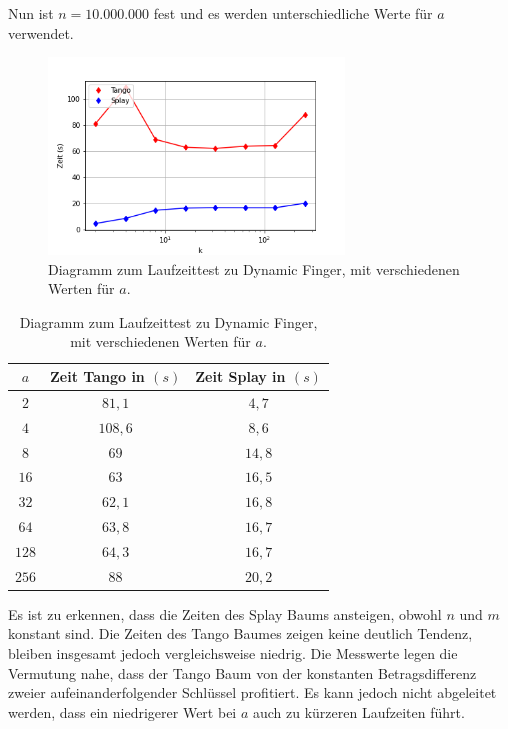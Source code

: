 \documentclass[a4paper,12pt]{article}
\begin{document}
\noindent Nun ist $n = 10.000.000$ fest und es werden unterschiedliche Werte für $a$ verwendet.

\begin{figure}[H]
	\centering
	\includegraphics[width=0.7\textwidth]{"Medien/laufzeittest/diagramm/dynamicfingerNfest"}
	\caption{Diagramm zum Laufzeittest zu Dynamic Finger, mit verschiedenen Werten für $a$.}
\end{figure}
\begin{table}[H]
	\begin{center}
		\begin{tabular}[c]{|c|c|c|}
			\hline
			$a$ & Zeit Tango in $\left(s\right)$ &Zeit Splay in $\left(s\right)$ \\
			\hline
			$2$ & $81,1$ &$4,7$ \\
			\hline
			$4$  & $108,6$ &$8,6$  \\
			\hline
			$8$  & $69$ &$14,8$  \\
			\hline
			$16$  & $63$ &$16,5$  \\
			\hline
			$32$  & $62,1$ &$16,8$  \\
			\hline
			$64$  & $63,8$ &$16,7$  \\
			\hline
			$128$  & $64,3$ &$16,7$  \\
			\hline
			$256$  & $88$ &$20,2$  \\
			\hline
		\end{tabular}
		\caption{Diagramm zum Laufzeittest zu Dynamic Finger, mit verschiedenen Werten für $a$.} 
	\end{center}
\end{table}\noindent Es ist zu erkennen, dass die Zeiten des Splay Baums ansteigen, obwohl $n$ und $m$ konstant sind. Die Zeiten des Tango Baumes zeigen keine deutlich Tendenz, bleiben insgesamt jedoch vergleichsweise niedrig. Die Messwerte legen die Vermutung nahe, dass der Tango Baum von der konstanten Betragsdifferenz zweier aufeinanderfolgender Schlüssel profitiert. Es kann jedoch nicht abgeleitet werden, dass ein niedrigerer Wert bei $a$ auch zu kürzeren Laufzeiten führt.  
\end{document}
